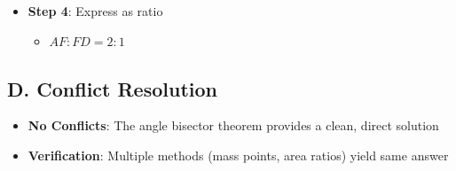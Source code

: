 \documentclass[12pt]{article}
\begin{document}
\begin{conversionbox}
\begin{itemize}[leftmargin=*]
    \item \textbf{Step 4}: Express as ratio
    \begin{itemize}
        \item $AF : FD = 2 : 1$
    \end{itemize}
\end{itemize}

\subsection*{D. Conflict Resolution}
\begin{itemize}[leftmargin=*]
    \item \textbf{No Conflicts}: The angle bisector theorem provides a clean, direct solution
    \item \textbf{Verification}: Multiple methods (mass points, area ratios) yield same answer
\end{itemize}
\end{conversionbox}
\end{document}
